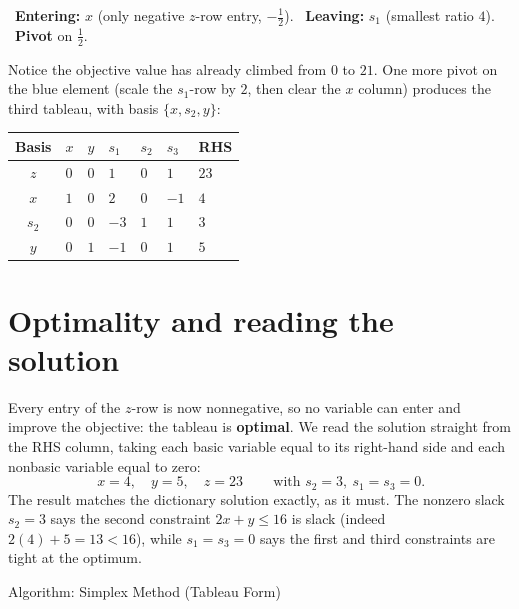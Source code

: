 \noindent%
{\color{algenter}\ \textbf{Entering:}} $x$ (only negative $z$-row entry, $-\tfrac12$).\quad
{\color{algleave}\ \textbf{Leaving:}} $s_1$ (smallest ratio $4$).\quad
{\color{algpivot}\ \textbf{Pivot}} on $\tfrac12$.

\medskip
Notice the objective value has already climbed from $0$ to $21$. One more pivot on the blue element (scale the $s_1$-row by $2$, then clear the $x$ column) produces the third tableau, with basis $\{x,s_2,y\}$:
\begin{center}
\renewcommand{\arraystretch}{1.3}
\begin{tabular}{c|ZZZZZ|Z}
\toprule
Basis & $x$ & $y$ & $s_1$ & $s_2$ & $s_3$ & RHS\\
\midrule
{}$z$ & $0$ & $0$ & $1$ & $0$ & $1$ & $23$\\
\midrule
$x$   & $1$ & $0$ & $2$  & $0$ & $-1$ & $4$\\
$s_2$ & $0$ & $0$ & $-3$ & $1$ & $1$  & $3$\\
$y$   & $0$ & $1$ & $-1$ & $0$ & $1$  & $5$\\
\bottomrule
\end{tabular}
\end{center}

\section{Optimality and reading the solution}
\label{sec:tableau-optimality}

Every entry of the $z$-row is now nonnegative, so no variable can enter and improve the objective: the tableau is \textbf{optimal}. We read the solution straight from the RHS column, taking each basic variable equal to its right-hand side and each nonbasic variable equal to zero:
\[
\boxed{\,x = 4,\quad y = 5,\quad z = 23\,}
\qquad\text{with } s_2 = 3,\ s_1 = s_3 = 0.
\]
The result matches the dictionary solution exactly, as it must. The nonzero slack $s_2=3$ says the second constraint $2x+y\le 16$ is slack (indeed $2(4)+5 = 13 < 16$), while $s_1=s_3=0$ says the first and third constraints are tight at the optimum.

\begin{algocard}{Algorithm: Simplex Method (Tableau Form)}
\end{algocard}

